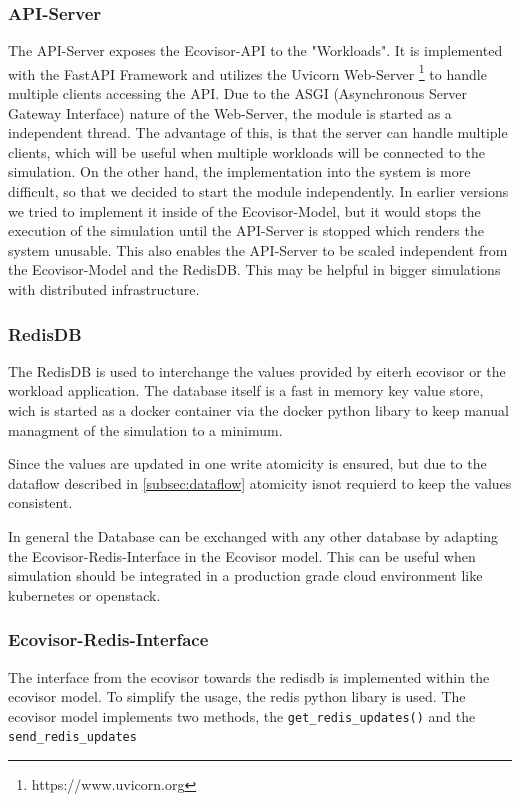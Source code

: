 \subsubsection{API-Server} %
The API-Server exposes the Ecovisor-API to the "Workloads". It is implemented with the FastAPI Framework and utilizes the Uvicorn Web-Server \footnote{https://www.uvicorn.org} to handle multiple clients accessing the API. Due to the ASGI (Asynchronous Server Gateway Interface) nature of the Web-Server, the module is started as a independent thread. The advantage of this, is that the server can handle multiple clients, which will be useful when multiple workloads will be connected to the simulation. On the other hand, the implementation into the system is more difficult, so that we decided to start the module independently. In earlier versions we tried to implement it inside of the Ecovisor-Model, but it would stops the execution of the simulation until the API-Server is stopped which renders the system unusable. This also enables the API-Server to be scaled independent from the Ecovisor-Model and the RedisDB. This may be helpful in bigger simulations with distributed infrastructure.

\subsubsection{RedisDB}
The RedisDB is used to interchange the values provided by eiterh ecovisor or the workload application. The database itself is a fast in memory key value store, wich is started as a docker container via the docker python libary %
to keep manual managment of the simulation to a minimum.

Since the values are updated in one write atomicity is ensured, but due to the dataflow described in \ref{subsec:dataflow}
atomicity isnot requierd to keep the values consistent.

In general the Database can be exchanged with any other database by adapting the Ecovisor-Redis-Interface in the Ecovisor model. This can be useful when simulation should be integrated
in a production grade cloud environment like kubernetes or openstack.


\subsubsection{Ecovisor-Redis-Interface}
The interface from the ecovisor towards the redisdb is implemented within the ecovisor model. To simplify the usage, the redis python libary %
is used. The ecovisor model implements two methods, the
\texttt{get\_redis\_updates()} and the \texttt{send\_redis\_updates} %

